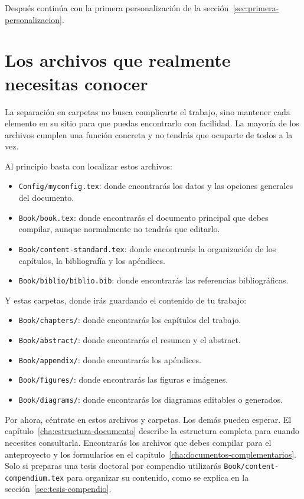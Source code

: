Después continúa con la primera personalización de la sección~\ref{sec:primera-personalizacion}.

\section{Los archivos que realmente necesitas conocer}
\label{sec:archivos-esenciales}

La separación en carpetas no busca complicarte el trabajo, sino mantener cada elemento en su sitio para que puedas encontrarlo con facilidad. La mayoría de los archivos cumplen una función concreta y no tendrás que ocuparte de todos a la vez.

Al principio basta con localizar estos archivos:

\begin{itemize}
  \item \texttt{Config/myconfig.tex}: donde encontrarás los datos y las opciones generales del documento.
  \item \texttt{Book/book.tex}: donde encontrarás el documento principal que debes compilar, aunque normalmente no tendrás que editarlo.
  \item \texttt{Book/content-standard.tex}: donde encontrarás la organización de los capítulos, la bibliografía y los apéndices.
  \item \texttt{Book/biblio/biblio.bib}: donde encontrarás las referencias bibliográficas.
\end{itemize}

Y estas carpetas, donde irás guardando el contenido de tu trabajo:

\begin{itemize}
  \item \texttt{Book/chapters/}: donde encontrarás los capítulos del trabajo.
  \item \texttt{Book/abstract/}: donde encontrarás el resumen y el abstract.
  \item \texttt{Book/appendix/}: donde encontrarás los apéndices.
  \item \texttt{Book/figures/}: donde encontrarás las figuras e imágenes.
  \item \texttt{Book/diagrams/}: donde encontrarás los diagramas editables o generados.
\end{itemize}

Por ahora, céntrate en estos archivos y carpetas. Los demás pueden esperar. El capítulo~\ref{cha:estructura-documento} describe la estructura completa para cuando necesites consultarla. Encontrarás los archivos que debes compilar para el anteproyecto y los formularios en el capítulo~\ref{cha:documentos-complementarios}. Solo si preparas una tesis doctoral por compendio utilizarás \texttt{Book/content-compendium.tex} para organizar su contenido, como se explica en la sección~\ref{sec:tesis-compendio}.

